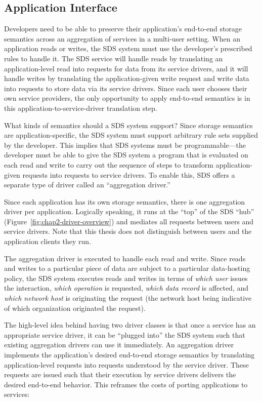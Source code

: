 \subsection{Application Interface}

Developers need to be able to preserve their application's
end-to-end storage semantics across an aggregation of services
in a multi-user setting.  When an application reads or writes, the SDS system
must use the developer's prescribed rules to handle it.  The SDS service will handle reads by
translating an application-level read into requests for data from its service
drivers, and it will handle writes by translating the application-given write
request and write data into requests to store data via its service drivers.
Since each user chooses their own service providers, 
the only opportunity to apply end-to-end semantics is in this
application-to-service-driver translation step.

What kinds of semantics should a SDS system support?  Since storage semantics
are application-specific, the SDS system must support arbitrary rule sets
supplied by the developer.  This implies that SDS systems must be
programmable---the developer must be able to give the SDS system a program that
is evaluated on each read and write to carry out the sequence of steps to
transform application-given requests into requests to service drivers.
To enable this, SDS offers a separate type of driver called an ``aggregation
driver.''

Since each application has its own storage semantics,
there is one aggregation driver per application.  Logically speaking, it runs at
the ``top'' of the SDS ``hub'' (Figure~\ref{fig:chap2-driver-overview})
and mediates all requests between users and
service drivers.  Note that this thesis does not
distinguish between users and the application clients
they run.

The aggregation driver is executed to handle each
read and write.  Since reads and writes to a particular piece of data are
subject to a particular data-hosting policy,
the SDS system executes reads and writes in terms of \emph{which user} issues the
interaction, \emph{which operation} is requested, \emph{which data
record} is affected, and \emph{which network host} is originating the request
(the network host being indicative of which organization originated the
request).

The high-level idea behind having two driver classes is that once a service has an appropriate service driver,
it can be ``plugged into'' the SDS system such that existing aggregation drivers
can use it immediately.  An aggregation driver implements the application's desired end-to-end storage
semantics by translating
application-level requests into requests understood by the service driver.  These
requests are issued such that their execution
by service drivers delivers the desired end-to-end behavior.  This reframes the
costs of porting applications to services:

